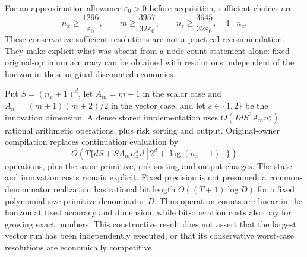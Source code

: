 For an approximation allowance $\varepsilon_0>0$ before acquisition, sufficient choices are
\[
 n_x\geq\frac{1296}{\varepsilon_0},\qquad
 m\geq\frac{3957}{32\varepsilon_0},\qquad
 n_z\geq\frac{3645}{32\varepsilon_0},\quad 4\mid n_z.
\]
These conservative sufficient resolutions are not a practical recommendation. They make explicit what was absent from a node-count statement alone: fixed original-optimum accuracy can be obtained with resolutions independent of the horizon in these original discounted economies.

Put $S=(n_x+1)^d$, let $A_m=m+1$ in the scalar case and $A_m=(m+1)(m+2)/2$ in the vector case, and let $s\in\{1,2\}$ be the innovation dimension. A dense stored implementation uses $O(TdS^2A_mn_z^s)$ rational arithmetic operations, plus risk sorting and output. Original-owner compilation replaces continuation evaluation by
\[
 O\!\left(T\{dS+SA_mn_z^s\,d[2^d+\log(n_x+1)]\}\right)
\]
operations, plus the same primitive, risk-sorting and output charges. The state and innovation costs remain explicit. Fixed precision is not presumed: a common-denominator realization has rational bit length $O((T+1)\log D)$ for a fixed polynomial-size primitive denominator $D$. Thus operation counts are linear in the horizon at fixed accuracy and dimension, while bit-operation costs also pay for growing exact numbers. This constructive result does not assert that the largest vector run has been independently executed, or that its conservative worst-case resolutions are economically competitive.


